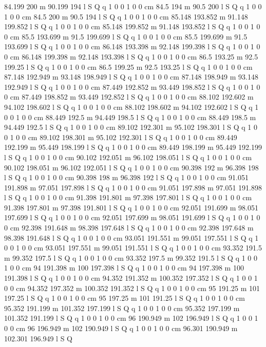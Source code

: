 84.199 200 m 90.199 194 l S Q
q 1 0 0 1 0 0 cm
84.5 194 m 90.5 200 l S Q
q 1 0 0 1 0 0 cm
84.5 200 m 90.5 194 l S Q
q 1 0 0 1 0 0 cm
85.148 193.852 m 91.148 199.852 l S Q
q 1 0 0 1 0 0 cm
85.148 199.852 m 91.148 193.852 l S Q
q 1 0 0 1 0 0 cm
85.5 193.699 m 91.5 199.699 l S Q
q 1 0 0 1 0 0 cm
85.5 199.699 m 91.5 193.699 l S Q
q 1 0 0 1 0 0 cm
86.148 193.398 m 92.148 199.398 l S Q
q 1 0 0 1 0 0 cm
86.148 199.398 m 92.148 193.398 l S Q
q 1 0 0 1 0 0 cm
86.5 193.25 m 92.5 199.25 l S Q
q 1 0 0 1 0 0 cm
86.5 199.25 m 92.5 193.25 l S Q
q 1 0 0 1 0 0 cm
87.148 192.949 m 93.148 198.949 l S Q
q 1 0 0 1 0 0 cm
87.148 198.949 m 93.148 192.949 l S Q
q 1 0 0 1 0 0 cm
87.449 192.852 m 93.449 198.852 l S Q
q 1 0 0 1 0 0 cm
87.449 198.852 m 93.449 192.852 l S Q
q 1 0 0 1 0 0 cm
88.102 192.602 m 94.102 198.602 l S Q
q 1 0 0 1 0 0 cm
88.102 198.602 m 94.102 192.602 l S Q
q 1 0 0 1 0 0 cm
88.449 192.5 m 94.449 198.5 l S Q
q 1 0 0 1 0 0 cm
88.449 198.5 m 94.449 192.5 l S Q
q 1 0 0 1 0 0 cm
89.102 192.301 m 95.102 198.301 l S Q
q 1 0 0 1 0 0 cm
89.102 198.301 m 95.102 192.301 l S Q
q 1 0 0 1 0 0 cm
89.449 192.199 m 95.449 198.199 l S Q
q 1 0 0 1 0 0 cm
89.449 198.199 m 95.449 192.199 l S Q
q 1 0 0 1 0 0 cm
90.102 192.051 m 96.102 198.051 l S Q
q 1 0 0 1 0 0 cm
90.102 198.051 m 96.102 192.051 l S Q
q 1 0 0 1 0 0 cm
90.398 192 m 96.398 198 l S Q
q 1 0 0 1 0 0 cm
90.398 198 m 96.398 192 l S Q
q 1 0 0 1 0 0 cm
91.051 191.898 m 97.051 197.898 l S Q
q 1 0 0 1 0 0 cm
91.051 197.898 m 97.051 191.898 l S Q
q 1 0 0 1 0 0 cm
91.398 191.801 m 97.398 197.801 l S Q
q 1 0 0 1 0 0 cm
91.398 197.801 m 97.398 191.801 l S Q
q 1 0 0 1 0 0 cm
92.051 191.699 m 98.051 197.699 l S Q
q 1 0 0 1 0 0 cm
92.051 197.699 m 98.051 191.699 l S Q
q 1 0 0 1 0 0 cm
92.398 191.648 m 98.398 197.648 l S Q
q 1 0 0 1 0 0 cm
92.398 197.648 m 98.398 191.648 l S Q
q 1 0 0 1 0 0 cm
93.051 191.551 m 99.051 197.551 l S Q
q 1 0 0 1 0 0 cm
93.051 197.551 m 99.051 191.551 l S Q
q 1 0 0 1 0 0 cm
93.352 191.5 m 99.352 197.5 l S Q
q 1 0 0 1 0 0 cm
93.352 197.5 m 99.352 191.5 l S Q
q 1 0 0 1 0 0 cm
94 191.398 m 100 197.398 l S Q
q 1 0 0 1 0 0 cm
94 197.398 m 100 191.398 l S Q
q 1 0 0 1 0 0 cm
94.352 191.352 m 100.352 197.352 l S Q
q 1 0 0 1 0 0 cm
94.352 197.352 m 100.352 191.352 l S Q
q 1 0 0 1 0 0 cm
95 191.25 m 101 197.25 l S Q
q 1 0 0 1 0 0 cm
95 197.25 m 101 191.25 l S Q
q 1 0 0 1 0 0 cm
95.352 191.199 m 101.352 197.199 l S Q
q 1 0 0 1 0 0 cm
95.352 197.199 m 101.352 191.199 l S Q
q 1 0 0 1 0 0 cm
96 190.949 m 102 196.949 l S Q
q 1 0 0 1 0 0 cm
96 196.949 m 102 190.949 l S Q
q 1 0 0 1 0 0 cm
96.301 190.949 m 102.301 196.949 l S Q
